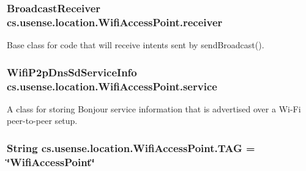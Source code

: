 \subsubsection[{receiver}]{\setlength{\rightskip}{0pt plus 5cm}Broadcast\+Receiver cs.\+usense.\+location.\+Wifi\+Access\+Point.\+receiver\hspace{0.3cm}{\ttfamily [private]}}\label{classcs_1_1usense_1_1location_1_1_wifi_access_point_ac042464a16fe1ff488c047e496c1b7cc}
Base class for code that will receive intents sent by send\+Broadcast(). \hypertarget{classcs_1_1usense_1_1location_1_1_wifi_access_point_a5f95d5d10ff299d16e791c6bc3be2d88}{}
\subsubsection[{service}]{\setlength{\rightskip}{0pt plus 5cm}Wifi\+P2p\+Dns\+Sd\+Service\+Info cs.\+usense.\+location.\+Wifi\+Access\+Point.\+service\hspace{0.3cm}{\ttfamily [private]}}\label{classcs_1_1usense_1_1location_1_1_wifi_access_point_a5f95d5d10ff299d16e791c6bc3be2d88}
A class for storing Bonjour service information that is advertised over a Wi-\/\+Fi peer-\/to-\/peer setup. \hypertarget{classcs_1_1usense_1_1location_1_1_wifi_access_point_a87b8835d83e55010b41b2621ebdbcfd1}{}
\subsubsection[{T\+A\+G}]{\setlength{\rightskip}{0pt plus 5cm}String cs.\+usense.\+location.\+Wifi\+Access\+Point.\+T\+A\+G = \char`\"{}Wifi\+Access\+Point\char`\"{}\hspace{0.3cm}{\ttfamily [private]}}\label{classcs_1_1usense_1_1location_1_1_wifi_access_point_a87b8835d83e55010b41b2621ebdbcfd1}
\hypertarget{classcs_1_1usense_1_1location_1_1_wifi_access_point_afe22ca0f9a637b92889a09bc152ad2b5}{}
